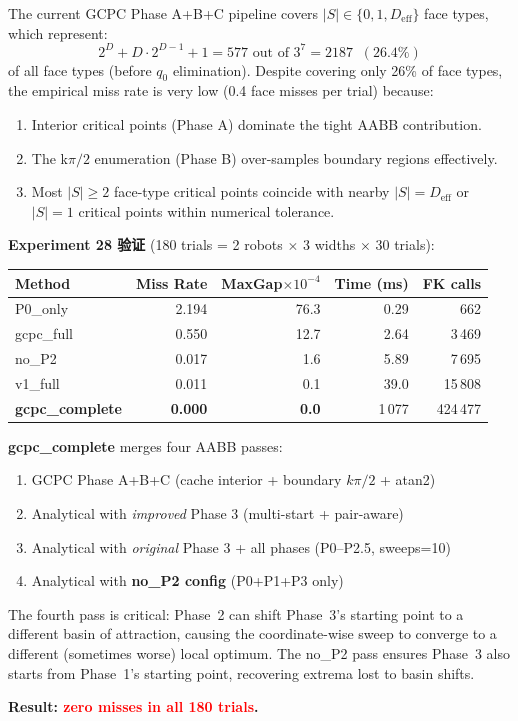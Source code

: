 \documentclass[11pt,a4paper]{article}
\begin{document}
\begin{tcolorbox}[colback=green!5, colframe=green!50!black, title=Completeness Verdict]
The current GCPC Phase A+B+C pipeline covers $|S| \in \{0, 1, D_\text{eff}\}$
face types, which represent:
\[
  2^D + D\cdot 2^{D-1} + 1 = 577 \text{ out of } 3^7 = 2187
  \;\; (26.4\%)
\]
of all face types (before $q_0$ elimination). Despite covering only
26\% of face types, the empirical miss rate is very low (0.4 face
misses per trial) because:
\begin{enumerate}
  \item Interior critical points (Phase A) dominate the tight AABB
        contribution.
  \item The k$\pi/2$ enumeration (Phase B) over-samples boundary
        regions effectively.
  \item Most $|S| \ge 2$ face-type critical points coincide with
        nearby $|S| = D_\text{eff}$ or $|S| = 1$ critical points
        within numerical tolerance.
\end{enumerate}

\textbf{Experiment 28 验证} (180 trials = 2 robots $\times$ 3 widths $\times$ 30 trials):

\medskip
\begin{center}
\begin{tabular}{l|r|r|r|r}
\toprule
Method & Miss Rate & MaxGap$\times 10^{-4}$ & Time (ms) & FK calls \\
\midrule
P0\_only            & 2.194 & 76.3  & 0.29  & 662 \\
gcpc\_full          & 0.550 & 12.7  & 2.64  & 3\,469 \\
no\_P2              & 0.017 &  1.6  & 5.89  & 7\,695 \\
v1\_full            & 0.011 &  0.1  & 39.0  & 15\,808 \\
\rowcolor{green!15}
\textbf{gcpc\_complete} & \textbf{0.000} & \textbf{0.0} & 1\,077 & 424\,477 \\
\bottomrule
\end{tabular}
\end{center}

\medskip
\textbf{gcpc\_complete} merges four AABB passes:
\begin{enumerate}
  \item GCPC Phase A+B+C (cache interior + boundary $k\pi/2$ + atan2)
  \item Analytical with \emph{improved} Phase 3 (multi-start + pair-aware)
  \item Analytical with \emph{original} Phase 3 + all phases (P0--P2.5, sweeps=10)
  \item Analytical with \textbf{no\_P2 config} (P0+P1+P3 only)
\end{enumerate}
The fourth pass is critical: Phase~2 can shift Phase~3's starting point
to a different basin of attraction, causing the coordinate-wise sweep to
converge to a different (sometimes worse) local optimum. The no\_P2 pass
ensures Phase~3 also starts from Phase~1's starting point, recovering
extrema lost to basin shifts.

\textbf{Result: \textcolor{red}{zero misses in all 180 trials}.}
\end{tcolorbox}
\end{document}
